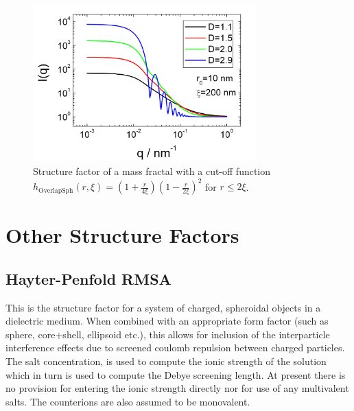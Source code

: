 \begin{figure}[htb]
\begin{center}
\includegraphics[width=0.768\textwidth,height=0.488\textwidth]{../images/structure_factor/MassFractals/SQOverlapSphCutOff.png}
\end{center}
\caption{Structure factor of a mass fractal with a
cut-off function $h_\text{OverlapSph}(r,\xi) = \left(1+\frac{r}{4\xi}\right)\left(1-\frac{r}{2\xi}\right)^2$ for $r\leq 2\xi$.}
\label{fig:SQGaussCutOff}
\end{figure}

\clearpage
\section{Other Structure Factors}

\subsection{Hayter-Penfold RMSA \cite{Hayter1981,Hansen1982}}

This is the structure factor for a system of charged, spheroidal objects in a dielectric
medium. When
combined with an appropriate form factor (such as sphere, core+shell, ellipsoid etc.),
this allows for inclusion of the interparticle interference effects due to screened
coulomb repulsion between charged particles.
The salt concentration, is used to compute the ionic strength of the solution which
in turn is used to compute the Debye screening length. At present there is no provision
for entering the ionic strength directly nor for use of any multivalent salts. The
counterions are also assumed to be monovalent.



